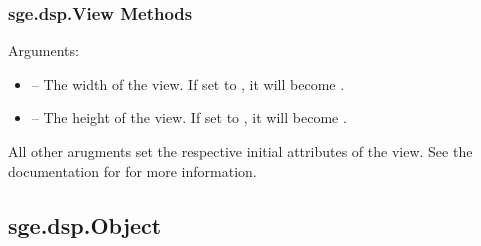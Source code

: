 \documentclass[letterpaper,10pt,english]{sphinxmanual}
\begin{document}
\subsubsection{sge.dsp.View Methods}
\label{dsp:sge-dsp-view-methods}

\begin{fulllineitems}
\label{dsp:sge.dsp.View.__init__}
Arguments:
\begin{itemize}
\item {} 
 -- The width of the view.  If set to ,
it will become .

\item {} 
 -- The height of the view.  If set to
, it will become .

\end{itemize}

All other arugments set the respective initial attributes of the
view.  See the documentation for {\hyperref[dsp:sge.dsp.View]{\emph{}}} for more
information.

\end{fulllineitems}



\subsection{sge.dsp.Object}
\label{dsp:sge-dsp-object}
\end{document}
